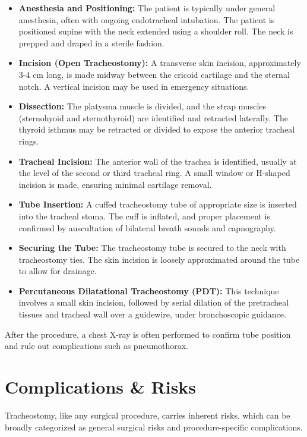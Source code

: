 \begin{itemize}
  \item \textbf{Anesthesia and Positioning:} The patient is typically under general anesthesia, often with ongoing endotracheal intubation. The patient is positioned supine with the neck extended using a shoulder roll. The neck is prepped and draped in a sterile fashion.
  
  \item \textbf{Incision (Open Tracheostomy):} A transverse skin incision, approximately 3-4 cm long, is made midway between the cricoid cartilage and the sternal notch. A vertical incision may be used in emergency situations.

  \item \textbf{Dissection:} The platysma muscle is divided, and the strap muscles (sternohyoid and sternothyroid) are identified and retracted laterally. The thyroid isthmus may be retracted or divided to expose the anterior tracheal rings.

  \item \textbf{Tracheal Incision:} The anterior wall of the trachea is identified, usually at the level of the second or third tracheal ring. A small window or H-shaped incision is made, ensuring minimal cartilage removal.

  \item \textbf{Tube Insertion:} A cuffed tracheostomy tube of appropriate size is inserted into the tracheal stoma. The cuff is inflated, and proper placement is confirmed by auscultation of bilateral breath sounds and capnography.

  \item \textbf{Securing the Tube:} The tracheostomy tube is secured to the neck with tracheostomy ties. The skin incision is loosely approximated around the tube to allow for drainage.

  \item \textbf{Percutaneous Dilatational Tracheostomy (PDT):} This technique involves a small skin incision, followed by serial dilation of the pretracheal tissues and tracheal wall over a guidewire, under bronchoscopic guidance.
\end{itemize}

After the procedure, a chest X-ray is often performed to confirm tube position and rule out complications such as pneumothorax.

\section*{Complications \& Risks}
Tracheostomy, like any surgical procedure, carries inherent risks, which can be broadly categorized as general surgical risks and procedure-specific complications.

